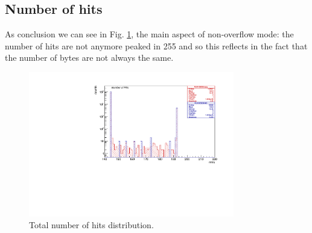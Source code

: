\subsection{Number of hits}
As conclusion we can see in Fig. \ref{fig:6}, the main aspect of non-overflow mode: the number of hits are not anymore peaked in 255 and so this reflects in the fact that the number of bytes are not always the same.
\begin{figure}[!h]
\centering
\includegraphics[width =0.8\textwidth]{figures/pdf/figure_00009_nhits_105038}
\caption{Total number of hits distribution.}
\label{fig:6}
\end{figure}










